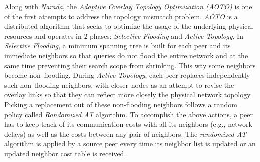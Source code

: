 
Along with {\sl Narada}, the \emph{Adaptive Overlay Topology 
Optimization (AOTO)} \cite{LZXN2003} is one of the first attempts to address the
topology mismatch problem. \emph{AOTO} is a distributed algorithm that seeks to
optimize the usage of the underlying physical resources and operates in
$2$ phases:
\emph{Selective Flooding} and \emph{Active Topology}.
In \emph{Selective Flooding}, a minimum spanning tree is built for each peer and
its immediate neighbors so that queries do not flood the entire network and at
the same time preventing their search scope from shrinking. This way some
neighbors become non--flooding. During \emph{Active Topology}, each peer
replaces independently such non--flooding neighbors, with closer nodes as an attempt
to revise the overlay links so that they can reflect more closely the physical
network topology. Picking a replacement out of these non-flooding
neighbors follows a random policy called \emph{Randomized AT} algorithm.
To accomplish the above actions, a peer has to keep track of 
its communication costs with all its neighbors (e.g., network delays)
as well as the costs between any pair of neighbors. The \emph{randomized AT}
algorithm is applied by a source peer
every time its neighbor list is updated or an updated neighbor cost 
table is received.
%
%
